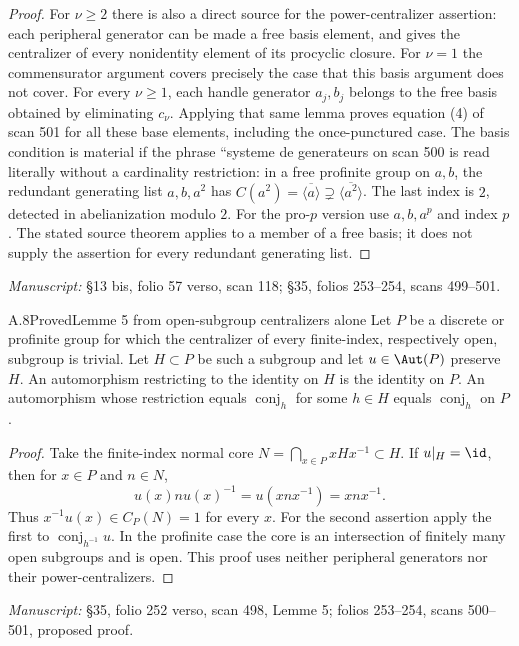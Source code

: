 \begin{proof}
For $\nu\ge2$ there is also a direct source for the power-centralizer assertion: each peripheral generator can be made a free basis element, and \cite[Lemma (2.1.2)]{A_Nakamura1994} gives the centralizer of every nonidentity element of its procyclic closure. For $\nu=1$ the commensurator argument covers precisely the case that this basis argument does not cover. For every $\nu\ge1$, each handle generator $a_j,b_j$ belongs to the free basis obtained by eliminating $c_\nu$. Applying that same lemma proves equation (4) of scan 501 for all these base elements, including the once-punctured case. The basis condition is material if the phrase ``systeme de generateurs on scan 500 is read literally without a cardinality restriction: in a free profinite group on $a,b$, the redundant generating list $a,b,a^2$ has $C(a^2)=\overline{\langle a\rangle}\supsetneq\overline{\langle a^2\rangle}$. The last index is $2$, detected in abelianization modulo $2$. For the pro-$p$ version use $a,b,a^p$ and index $p$. The stated source theorem applies to a member of a free basis; it does not supply the assertion for every redundant generating list.
\end{proof}
\noindent\emph{Manuscript:} \S13 bis, folio 57 verso, scan 118; \S35, folios 253--254, scans 499--501.

\begin{claim}{A.8}{Proved}{Lemme 5 from open-subgroup centralizers alone}
Let $P$ be a discrete or profinite group for which the centralizer of every finite-index, respectively open, subgroup is trivial. Let $H\subset P$ be such a subgroup and let $u\in\Aut(P)$ preserve $H$. An automorphism restricting to the identity on $H$ is the identity on $P$. An automorphism whose restriction equals $\operatorname{conj}_h$ for some $h\in H$ equals $\operatorname{conj}_h$ on $P$.
\end{claim}
\begin{proof}
Take the finite-index normal core $N=\bigcap_{x\in P}xHx^{-1}\subset H$. If $u|_H=\id$, then for $x\in P$ and $n\in N$,
\[
 u(x)nu(x)^{-1}=u(xnx^{-1})=xnx^{-1}.
\]
Thus $x^{-1}u(x)\in C_P(N)=1$ for every $x$. For the second assertion apply the first to $\operatorname{conj}_{h^{-1}}u$. In the profinite case the core is an intersection of finitely many open subgroups and is open. This proof uses neither peripheral generators nor their power-centralizers.
\end{proof}
\noindent\emph{Manuscript:} \S35, folio 252 verso, scan 498, Lemme 5; folios 253--254, scans 500--501, proposed proof.

